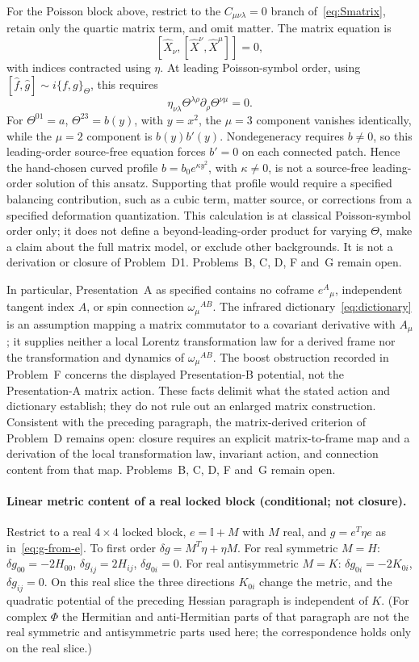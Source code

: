 For the Poisson block above, restrict to the
\(C_{\mu\nu\lambda}=0\) branch of~\eqref{eq:Smatrix}, retain only
the quartic matrix term, and omit matter. The matrix equation is
\[
  [\hat X_\nu,[\hat X^\nu,\hat X^\mu]]=0,
\]
with indices contracted using \(\eta\). At leading
Poisson-symbol order, using
\([\hat f,\hat g]\sim i\{f,g\}_\Theta\), this requires
\[
  \eta_{\nu\lambda}\Theta^{\lambda\rho}
  \partial_\rho\Theta^{\nu\mu}=0.
\]
For \(\Theta^{01}=a\), \(\Theta^{23}=b(y)\), with \(y=x^2\),
the \(\mu=3\) component vanishes identically, while the
\(\mu=2\) component is \(b(y)b'(y)\). Nondegeneracy requires
\(b\ne0\), so this leading-order source-free equation forces
\(b'=0\) on each connected patch. Hence the hand-chosen curved
profile \(b=b_0e^{\kappa y^2}\), with \(\kappa\ne0\), is not a
source-free leading-order solution of this ansatz. Supporting that
profile would require a specified balancing contribution, such
as a cubic term, matter source, or corrections from a specified
deformation quantization. This calculation is at classical
Poisson-symbol order only; it does not define a beyond-leading-order
product for varying \(\Theta\), make a claim about the full matrix
model, or exclude other backgrounds. It is not a derivation or
closure of Problem~D1. Problems~B, C, D, F and~G remain open.

In particular, Presentation~A as specified contains no coframe
\(e^A{}_\mu\), independent tangent index \(A\), or spin connection
\(\omega_\mu{}^{AB}\). The infrared dictionary~\eqref{eq:dictionary}
is an assumption mapping a matrix commutator to a covariant derivative
with \(A_\mu\); it supplies neither a local Lorentz transformation
law for a derived frame nor the transformation and dynamics of
\(\omega_\mu{}^{AB}\). The boost obstruction recorded in Problem~F
concerns the displayed Presentation-B potential, not the
Presentation-A matrix action. These facts delimit what the stated
action and dictionary establish; they do not rule out an enlarged
matrix construction. Consistent with the preceding paragraph, the
matrix-derived criterion of Problem~D remains open: closure requires
an explicit matrix-to-frame map and a derivation of the local
transformation law, invariant action, and connection content from
that map. Problems~B, C, D, F and~G remain open.

\paragraph{Linear metric content of a real locked block (conditional; not closure).}
Restrict to a real \(4\times4\) locked block, \(e=\mathbb{I}+M\) with \(M\)
real, and \(g=e^{T}\eta e\) as in~\eqref{eq:g-from-e}. To first order
\(\delta g=M^{T}\eta+\eta M\). For real symmetric \(M=H\):
\(\delta g_{00}=-2H_{00}\), \(\delta g_{ij}=2H_{ij}\), \(\delta g_{0i}=0\).
For real antisymmetric \(M=K\): \(\delta g_{0i}=-2K_{0i}\),
\(\delta g_{ij}=0\). On this real slice the three directions \(K_{0i}\)
change the metric, and the quadratic potential of the preceding Hessian
paragraph is independent of \(K\). (For complex \(\Phi\) the Hermitian and
anti-Hermitian parts of that paragraph are not the real symmetric and
antisymmetric parts used here; the correspondence holds only on the real
slice.)

